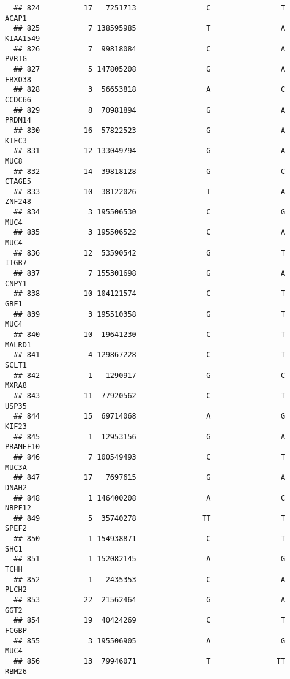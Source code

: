 \documentclass[12pt,twoside]{reedthesis}
\theoremstyle{definition}
\theoremstyle{definition}
\theoremstyle{remark}
\begin{document}
\begin{verbatim}
  ## 824          17   7251713                C                T          ACAP1
  ## 825           7 138595985                T                A       KIAA1549
  ## 826           7  99818084                C                A          PVRIG
  ## 827           5 147805208                G                A         FBXO38
  ## 828           3  56653818                A                C         CCDC66
  ## 829           8  70981894                G                A         PRDM14
  ## 830          16  57822523                G                A          KIFC3
  ## 831          12 133049794                G                A           MUC8
  ## 832          14  39818128                G                C         CTAGE5
  ## 833          10  38122026                T                A         ZNF248
  ## 834           3 195506530                C                G           MUC4
  ## 835           3 195506522                C                A           MUC4
  ## 836          12  53590542                G                T          ITGB7
  ## 837           7 155301698                G                A          CNPY1
  ## 838          10 104121574                C                T           GBF1
  ## 839           3 195510358                G                T           MUC4
  ## 840          10  19641230                C                T         MALRD1
  ## 841           4 129867228                C                T          SCLT1
  ## 842           1   1290917                G                C          MXRA8
  ## 843          11  77920562                C                T          USP35
  ## 844          15  69714068                A                G          KIF23
  ## 845           1  12953156                G                A       PRAMEF10
  ## 846           7 100549493                C                T          MUC3A
  ## 847          17   7697615                G                A          DNAH2
  ## 848           1 146400208                A                C         NBPF12
  ## 849           5  35740278               TT                T          SPEF2
  ## 850           1 154938871                C                T           SHC1
  ## 851           1 152082145                A                G           TCHH
  ## 852           1   2435353                C                A          PLCH2
  ## 853          22  21562464                G                A           GGT2
  ## 854          19  40424269                C                T          FCGBP
  ## 855           3 195506905                A                G           MUC4
  ## 856          13  79946071                T               TT          RBM26

\end{verbatim}
\end{document}
